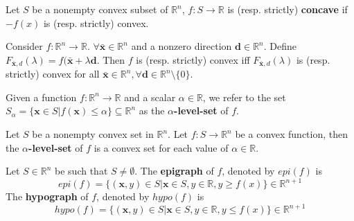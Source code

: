 			\begin{definition}
				Let $S$ be a nonempty convex subset of $\mathbb{R}^n$, $f: S \rightarrow \mathbb{R}$ is (resp. strictly) \textbf{concave} if $-f(x)$ is (resp. strictly) convex.
			\end{definition}


			\begin{theorem}
				Consider $f: \mathbb{R}^n\rightarrow \mathbb{R}$. $\forall \bar{\mathbf{x}} \in \mathbb{R}^n$ and a nonzero direction $\mathbf{d} \in \mathbb{R}^n$. Define $F_{\bar{\mathbf{x}}, d}(\lambda) = f(\bar{\mathbf{x}} + \lambda \mathbf{d}$. Then $f$ is (resp. strictly) convex iff $F_{\bar{\mathbf{x}}, d}(\lambda)$ is (resp. strictly) convex for all $\bar{\mathbf{x}} \in \mathbb{R}^n, \forall \mathbf{d} \in \mathbb{R}^n \setminus \{0\}$.
			\end{theorem}

			\begin{definition}
				Given a function $f: \mathbb{R}^n \rightarrow \mathbb{R}$ and a scalar $\alpha \in \mathbb{R}$, we refer to the set $S_\alpha = \{\mathbf{x} \in S|f(\mathbf{x}) \le \alpha\} \subseteq \mathbb{R}^n$ as the \textbf{$\alpha$-level-set} of $f$.
			\end{definition}

			\begin{lemma}
				Let $S$ be a nonempty convex set in $\mathbb{R}^n$. Let $f: S\rightarrow \mathbb{R}^n$ be a convex function, then the \textbf{$\alpha$-level-set} of $f$ is a convex set for each value of $\alpha \in \mathbb{R}$.
			\end{lemma}


			\begin{definition}
				Let $S \in \mathbb{R}^n$ be such that $S \neq \emptyset$. The \textbf{epigraph} of $f$, denoted by $epi(f)$ is
				\begin{equation}
					epi(f) = \{(\mathbf{x}, y) \in S|\mathbf{x} \in S, y \in \mathbb{R}, y \ge f(x)\} \in \mathbb{R}^{n+1}
				\end{equation}
				The \textbf{hypograph} of $f$, denoted by $hypo(f)$ is
				\begin{equation}
					hypo(f) = \{(\mathbf{x}, y) \in S|\mathbf{x} \in S, y \in \mathbb{R}, y \le f(x)\} \in \mathbb{R}^{n+1}
				\end{equation}
			\end{definition}

